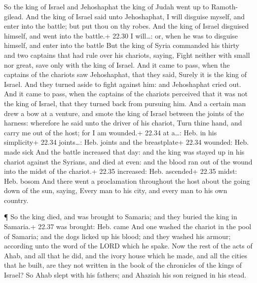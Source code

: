  So the king of Israel and Jehoshaphat the king of Judah
went up to Ramoth-gilead.  And the king of Israel said unto
Jehoshaphat, I will disguise myself, and enter into the battle; but put
thou on thy robes. And the king of Israel disguised himself, and went
into the battle.+ 22.30 I will\ldots: or, when he was to disguise
himself, and enter into the battle  But the king of Syria
commanded his thirty and two captains that had rule over his chariots,
saying, Fight neither with small nor great, save only with the king of
Israel.  And it came to pass, when the captains of the
chariots saw Jehoshaphat, that they said, Surely it is the king of
Israel. And they turned aside to fight against him: and Jehoshaphat
cried out.  And it came to pass, when the captains of the
chariots perceived that it was not the king of Israel, that they turned
back from pursuing him.  And a certain man drew a bow at a
venture, and smote the king of Israel between the joints of the harness:
wherefore he said unto the driver of his chariot, Turn thine hand, and
carry me out of the host; for I am wounded.+ 22.34 at a\ldots: Heb. in
his simplicity+ 22.34 joints\ldots: Heb. joints and the breastplate+
22.34 wounded: Heb. made sick  And the battle increased
that day: and the king was stayed up in his chariot against the Syrians,
and died at even: and the blood ran out of the wound into the midst of
the chariot.+ 22.35 increased: Heb. ascended+ 22.35 midst: Heb. bosom
 And there went a proclamation throughout the host about
the going down of the sun, saying, Every man to his city, and every man
to his own country.

 ¶ So the king died, and was brought to Samaria; and they
buried the king in Samaria.+ 22.37 was brought: Heb. came 
And one washed the chariot in the pool of Samaria; and the dogs licked
up his blood; and they washed his armour; according unto the word of the
LORD which he spake.  Now the rest of the acts of Ahab, and
all that he did, and the ivory house which he made, and all the cities
that he built, are they not written in the book of the chronicles of the
kings of Israel?  So Ahab slept with his fathers; and
Ahaziah his son reigned in his stead.

